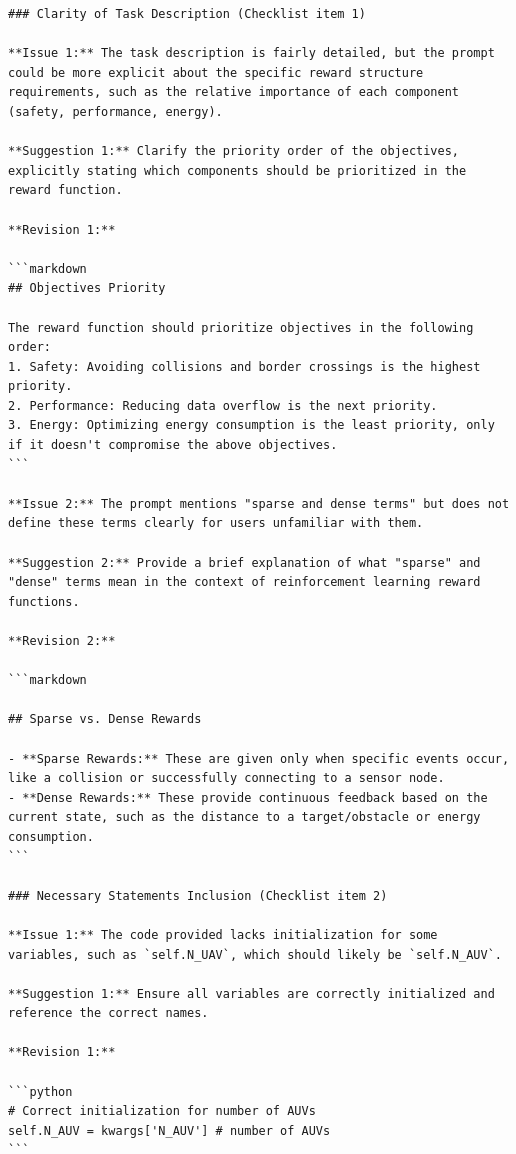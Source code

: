 \documentclass{article}
\begin{document}
\begin{verbatim}
### Clarity of Task Description (Checklist item 1)

**Issue 1:** The task description is fairly detailed, but the prompt could be more explicit about the specific reward structure requirements, such as the relative importance of each component (safety, performance, energy).

**Suggestion 1:** Clarify the priority order of the objectives, explicitly stating which components should be prioritized in the reward function.

**Revision 1:** 

```markdown
## Objectives Priority

The reward function should prioritize objectives in the following order:
1. Safety: Avoiding collisions and border crossings is the highest priority.
2. Performance: Reducing data overflow is the next priority.
3. Energy: Optimizing energy consumption is the least priority, only if it doesn't compromise the above objectives.
```

**Issue 2:** The prompt mentions "sparse and dense terms" but does not define these terms clearly for users unfamiliar with them.

**Suggestion 2:** Provide a brief explanation of what "sparse" and "dense" terms mean in the context of reinforcement learning reward functions.

**Revision 2:** 

```markdown

## Sparse vs. Dense Rewards

- **Sparse Rewards:** These are given only when specific events occur, like a collision or successfully connecting to a sensor node.
- **Dense Rewards:** These provide continuous feedback based on the current state, such as the distance to a target/obstacle or energy consumption.
```

### Necessary Statements Inclusion (Checklist item 2)

**Issue 1:** The code provided lacks initialization for some variables, such as `self.N_UAV`, which should likely be `self.N_AUV`.

**Suggestion 1:** Ensure all variables are correctly initialized and reference the correct names.

**Revision 1:** 

```python
# Correct initialization for number of AUVs
self.N_AUV = kwargs['N_AUV'] # number of AUVs
```


\end{verbatim}
\end{document}
